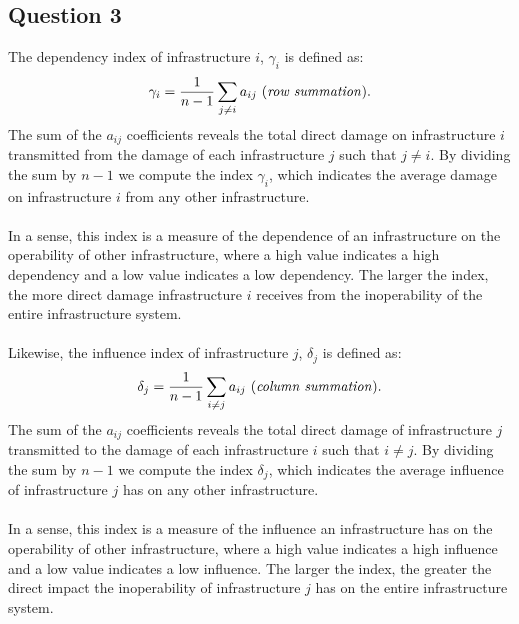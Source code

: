 \documentclass[11pt,a4paper]{article}
\begin{document}
\subsection*{Question 3}
The dependency index of infrastructure $i$, $\gamma_i$ is defined as:
\begin{align}
	\gamma_i = \frac{1}{n-1}\sum_{j \neq i} a_{ij} \text{ (\textit{row summation})}.
\end{align}
The sum of the $a_{ij}$ coefficients reveals the total direct damage on infrastructure $i$ transmitted from the damage of each infrastructure $j$ such that $j \neq i$. By dividing the sum by $n-1$ we compute the index $\gamma_i$, which indicates the average damage on infrastructure $i$ from any other infrastructure. \\
\\
In a sense, this index is a measure of the dependence of an infrastructure on the operability of other infrastructure, where a high value indicates a high dependency and a low value indicates a low dependency. The larger the index, the more direct damage infrastructure $i$ receives from the inoperability of the entire infrastructure system.\\
\\
Likewise, the influence index of infrastructure $j$, $\delta_j$ is defined as:
\begin{align}
	\delta_j = \frac{1}{n-1}\sum_{i \neq j} a_{ij} \text{ (\textit{column summation})}.
\end{align}
The sum of the $a_{ij}$ coefficients reveals the total direct damage of infrastructure $j$ transmitted to the damage of each infrastructure $i$ such that $i \neq j$. By dividing the sum by $n-1$ we compute the index $\delta_j$, which indicates the average influence of infrastructure $j$ has on any other infrastructure. \\
\\
In a sense, this index is a measure of the influence an infrastructure has on the operability of other infrastructure, where a high value indicates a high influence and a low value indicates a low influence. The larger the index, the greater the direct impact the inoperability of infrastructure $j$ has on the entire infrastructure system. \\
\\
\end{document}
